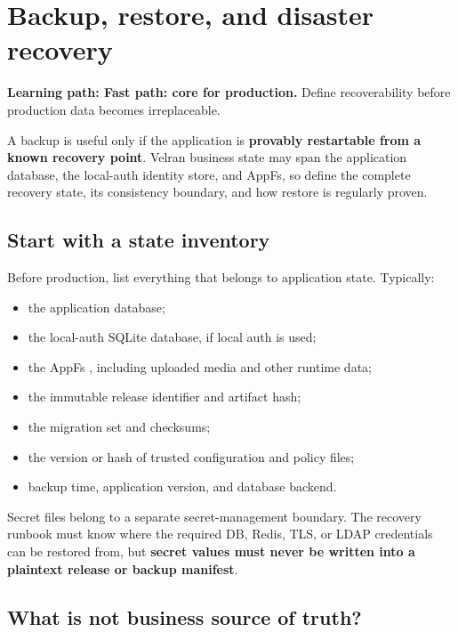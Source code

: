 \chapter{Backup, restore, and disaster recovery}\label{ch:recovery}

\noindent\textbf{Learning path: Fast path: core for production.} Define recoverability before production data becomes irreplaceable.\par\medskip

A backup is useful only if the application is \textbf{provably restartable from a known recovery point}. Velran business state may span the application database, the local-auth identity store, and AppFs, so define the complete recovery state, its consistency boundary, and how restore is regularly proven.

\section{Start with a state inventory}

Before production, list everything that belongs to application state. Typically:

\begin{itemize}
  \item the application database;
  \item the local-auth SQLite database, if local auth is used;
  \item the AppFs , including uploaded media and other runtime data;
  \item the immutable release identifier and artifact hash;
  \item the migration set and checksums;
  \item the version or hash of trusted configuration and policy files;
  \item backup time, application version, and database backend.
\end{itemize}

Secret files belong to a separate secret-management boundary. The recovery runbook must know where the required DB, Redis, TLS, or LDAP credentials can be restored from, but \textbf{secret values must never be written into a plaintext release or backup manifest}.

\section{What is not business source of truth?}

